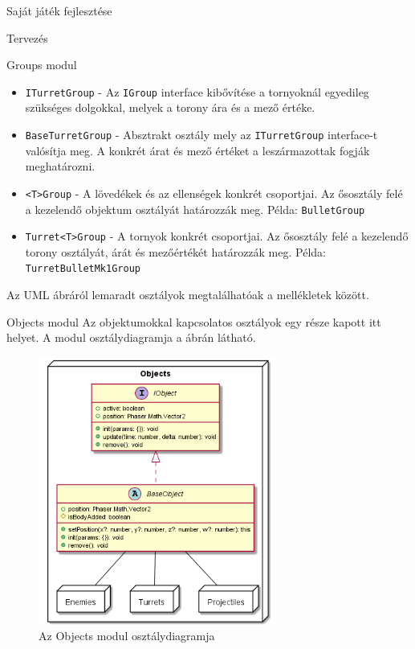 \begin{MyChapter}{Saját játék fejlesztése}
\begin{MySection}{Tervezés}
\begin{MySubSection}{Groups modul}
\begin{itemize}
				\item \texttt{ITurretGroup} - Az \texttt{IGroup} interface kibővítése a tornyoknál egyedileg szükséges dolgokkal, melyek a torony ára és a mező értéke.
				
				\item \texttt{BaseTurretGroup} - Absztrakt osztály mely az \texttt{ITurretGroup} interface-t valósítja meg. A konkrét árat és mező értéket a leszármazottak fogják meghatározni.
				
				\item \texttt{<T>Group} - A lövedékek és az ellenségek konkrét csoportjai. Az ősosztály felé a kezelendő objektum osztályát határozzák meg. Példa: \texttt{BulletGroup}
				
				\item \texttt{Turret<T>Group} - A tornyok konkrét csoportjai. Az ősosztály felé a kezelendő torony osztályát, árát és mezőértékét határozzák meg. Példa: \texttt{Turret\-Bullet\-Mk1\-Group}
			\end{itemize}
			
			Az UML ábráról lemaradt osztályok megtalálhatóak a mellékletek között.
		\end{MySubSection}
	
		\begin{MySubSection}{Objects modul}
			Az objektumokkal kapcsolatos osztályok egy része kapott itt helyet.
			A modul osztálydiagramja a  ábrán látható.
			
			\begin{figure}[H]
				\centering
				\includegraphics[width=0.7\textwidth]{kepek/uml/objects/object.png}
				\caption{Az Objects modul osztálydiagramja}
				\label{fig:uml:object}
			\end{figure}
			

\end{MySubSection}
\end{MySection}
\end{MyChapter}
